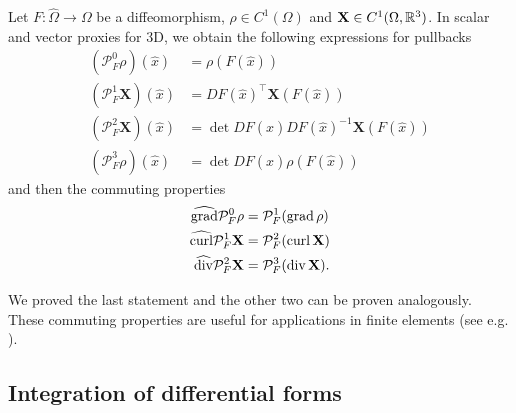 \documentclass[../main.tex]{subfiles}
\begin{document}
\begin{proposition}
    Let $F: \hat{\Omega} \rightarrow \Omega$ be a diffeomorphism, 
    $\rho \in C^1(\Omega)$ and $\mathbf{X} \in C^1(\Omega, \mathbb{R}^3)$.
    In scalar and vector proxies for 3D, we obtain the following expressions for 
    pullbacks
    \begin{align*}
        (\mathcal{P}^0_F \rho)(\hat{x}) &= \rho(F(\hat{x}))
        \\ (\mathcal{P}^1_F \mathbf{X})(\hat{x}) &= DF(\hat{x})^\top \mathbf{X}(F(\hat{x}))
        \\ (\mathcal{P}^2_F \mathbf{X})(\hat{x}) &= \det DF(\hat{x}) DF(\hat{x})^{-1} \mathbf{X}(F(\hat{x}))
        \\ (\mathcal{P}^3_F \rho)(\hat{x}) &= \det DF(\hat{x}) \rho(F(\hat{x}))
    \end{align*}
    and then the commuting properties
    \begin{align*}
        \widehat{\operatorname{grad}} \mathcal{P}^0_F \rho &= \mathcal{P}^1_F (\operatorname{grad} \rho)
        \\ \widehat{\mathbf{\operatorname{curl}}} \mathcal{P}^1_F \mathbf{X} &= \mathcal{P}^2_F (\operatorname{curl} \mathbf{X})
        \\ \widehat{\operatorname{div}} \mathcal{P}^2_F \mathbf{X} &= \mathcal{P}^3_F (\operatorname{div} \mathbf{X}).
    \end{align*}
\end{proposition}
We proved the last statement and the other two can be proven analogously. 
These commuting properties are useful for applications in finite elements
(see e.g. \cite[Sec.\,14.3]{ern_guermond}).





\subsection{Integration of differential forms}\label{sec:integration_of_differential_forms}
\end{document}
